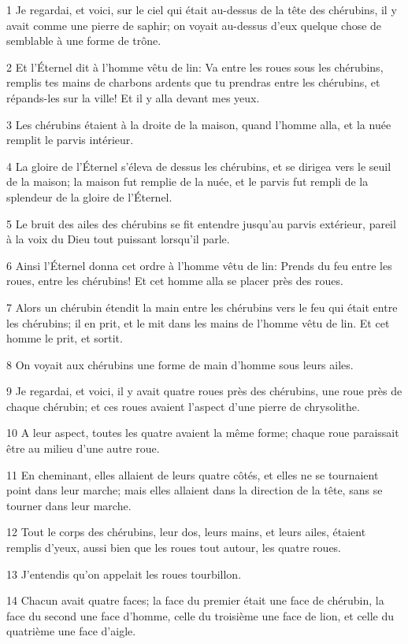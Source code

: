 \par 1 Je regardai, et voici, sur le ciel qui était au-dessus de la tête des chérubins, il y avait comme une pierre de saphir; on voyait au-dessus d'eux quelque chose de semblable à une forme de trône.
\par 2 Et l'Éternel dit à l'homme vêtu de lin: Va entre les roues sous les chérubins, remplis tes mains de charbons ardents que tu prendras entre les chérubins, et répands-les sur la ville! Et il y alla devant mes yeux.
\par 3 Les chérubins étaient à la droite de la maison, quand l'homme alla, et la nuée remplit le parvis intérieur.
\par 4 La gloire de l'Éternel s'éleva de dessus les chérubins, et se dirigea vers le seuil de la maison; la maison fut remplie de la nuée, et le parvis fut rempli de la splendeur de la gloire de l'Éternel.
\par 5 Le bruit des ailes des chérubins se fit entendre jusqu'au parvis extérieur, pareil à la voix du Dieu tout puissant lorsqu'il parle.
\par 6 Ainsi l'Éternel donna cet ordre à l'homme vêtu de lin: Prends du feu entre les roues, entre les chérubins! Et cet homme alla se placer près des roues.
\par 7 Alors un chérubin étendit la main entre les chérubins vers le feu qui était entre les chérubins; il en prit, et le mit dans les mains de l'homme vêtu de lin. Et cet homme le prit, et sortit.
\par 8 On voyait aux chérubins une forme de main d'homme sous leurs ailes.
\par 9 Je regardai, et voici, il y avait quatre roues près des chérubins, une roue près de chaque chérubin; et ces roues avaient l'aspect d'une pierre de chrysolithe.
\par 10 A leur aspect, toutes les quatre avaient la même forme; chaque roue paraissait être au milieu d'une autre roue.
\par 11 En cheminant, elles allaient de leurs quatre côtés, et elles ne se tournaient point dans leur marche; mais elles allaient dans la direction de la tête, sans se tourner dans leur marche.
\par 12 Tout le corps des chérubins, leur dos, leurs mains, et leurs ailes, étaient remplis d'yeux, aussi bien que les roues tout autour, les quatre roues.
\par 13 J'entendis qu'on appelait les roues tourbillon.
\par 14 Chacun avait quatre faces; la face du premier était une face de chérubin, la face du second une face d'homme, celle du troisième une face de lion, et celle du quatrième une face d'aigle.
